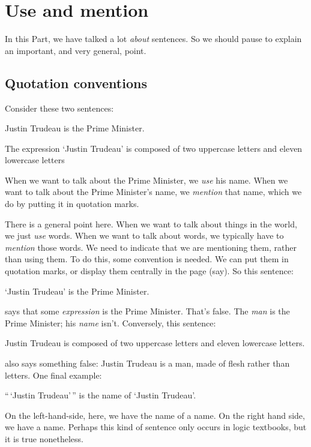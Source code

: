 \chapter{Use and mention}\label{s:UseMention}
In this Part, we have talked a lot \emph{about} sentences. So we should pause to explain an important, and very general, point.

\section{Quotation conventions}
Consider these two sentences:
	\begin{ebullet}
		\item Justin Trudeau is the Prime Minister.
		\item The expression `Justin Trudeau' is composed of two uppercase letters and eleven lowercase letters
	\end{ebullet}
When we want to talk about the Prime Minister, we \emph{use} his name. When we want to talk about the Prime Minister's name, we \emph{mention} that name, which we do by putting it in quotation marks.

There is a general point here. When we want to talk about things in the world, we just \emph{use} words. When we want to talk about words, we typically have to \emph{mention} those words. We need to indicate that we are mentioning them, rather than using them. To do this, some convention is needed. We can put them in quotation marks, or display them centrally in the page (say). So this sentence:
	\begin{ebullet}
		\item `Justin Trudeau' is the Prime Minister.
	\end{ebullet}
says that some \emph{expression} is the Prime Minister. That's false. The \emph{man} is the Prime Minister; his \emph{name} isn't. Conversely, this sentence:
	\begin{ebullet}
		\item Justin Trudeau is composed of two uppercase letters and eleven lowercase letters.
	\end{ebullet}
also says something false: Justin Trudeau is a man, made of flesh rather than letters. One final example:
	\begin{ebullet}
		\item ``\,`Justin Trudeau'\,'' is the name of `Justin Trudeau'.
	\end{ebullet} 
On the left-hand-side, here, we have the name of a name. On the right hand side, we have a name. Perhaps this kind of sentence only occurs in logic textbooks, but it is true nonetheless. 

